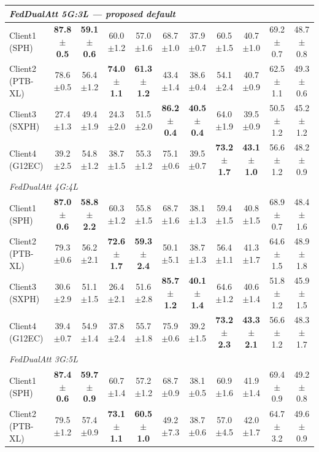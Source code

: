 \documentclass[a4paper]{article}
\begin{document}
\begin{longtable}{l|cc|cc|cc|cc|cc}
  \multicolumn{11}{l}{\textit{FedDualAtt 5G:3L --- proposed default}} \\
  \midrule
  Client1 (SPH)    & \textbf{87.8$\pm$0.5} & \textbf{59.1$\pm$0.6} & 60.0$\pm$1.2 & 57.0$\pm$1.6 & 68.7$\pm$1.0 & 37.9$\pm$0.7 & 60.5$\pm$1.5 & 40.7$\pm$1.0 & 69.2$\pm$0.7 & 48.7$\pm$0.8 \\
  Client2 (PTB-XL) & 78.6$\pm$0.5 & 56.4$\pm$1.2 & \textbf{74.0$\pm$1.1} & \textbf{61.3$\pm$1.2} & 43.4$\pm$1.4 & 38.6$\pm$0.4 & 54.1$\pm$2.4 & 40.7$\pm$0.9 & 62.5$\pm$1.1 & 49.3$\pm$0.6 \\
  Client3 (SXPH)   & 27.4$\pm$1.3 & 49.4$\pm$1.9 & 24.3$\pm$2.0 & 51.5$\pm$2.0 & \textbf{86.2$\pm$0.4} & \textbf{40.5$\pm$0.4} & 64.0$\pm$1.9 & 39.5$\pm$0.9 & 50.5$\pm$1.2 & 45.2$\pm$1.2 \\
  Client4 (G12EC)  & 39.2$\pm$2.5 & 54.8$\pm$1.2 & 38.7$\pm$1.5 & 55.3$\pm$1.2 & 75.1$\pm$0.6 & 39.5$\pm$0.7 & \textbf{73.2$\pm$1.7} & \textbf{43.1$\pm$1.0} & 56.6$\pm$1.2 & 48.2$\pm$0.9 \\
  \midrule
  \multicolumn{11}{l}{\textit{FedDualAtt 4G:4L}} \\
  \midrule
  Client1 (SPH)    & \textbf{87.0$\pm$0.6} & \textbf{58.8$\pm$2.2} & 60.3$\pm$1.2 & 55.8$\pm$1.5 & 68.7$\pm$1.6 & 38.1$\pm$1.3 & 59.4$\pm$1.5 & 40.8$\pm$1.5 & 68.9$\pm$0.7 & 48.4$\pm$1.6 \\
  Client2 (PTB-XL) & 79.3$\pm$0.6 & 56.2$\pm$2.1 & \textbf{72.6$\pm$1.7} & \textbf{59.3$\pm$2.4} & 50.1$\pm$5.1 & 38.7$\pm$1.3 & 56.4$\pm$1.1 & 41.3$\pm$1.7 & 64.6$\pm$1.5 & 48.9$\pm$1.8 \\
  Client3 (SXPH)   & 30.6$\pm$2.9 & 51.1$\pm$1.5 & 26.4$\pm$2.1 & 51.6$\pm$2.8 & \textbf{85.7$\pm$1.2} & \textbf{40.1$\pm$1.4} & 64.6$\pm$1.2 & 40.6$\pm$1.4 & 51.8$\pm$1.2 & 45.9$\pm$1.5 \\
  Client4 (G12EC)  & 39.4$\pm$0.7 & 54.9$\pm$1.4 & 37.8$\pm$2.4 & 55.7$\pm$1.8 & 75.9$\pm$0.6 & 39.2$\pm$1.5 & \textbf{73.2$\pm$2.3} & \textbf{43.3$\pm$2.1} & 56.6$\pm$1.2 & 48.3$\pm$1.7 \\
  \midrule
  \multicolumn{11}{l}{\textit{FedDualAtt 3G:5L}} \\
  \midrule
  Client1 (SPH)    & \textbf{87.4$\pm$0.6} & \textbf{59.7$\pm$0.9} & 60.7$\pm$1.4 & 57.2$\pm$1.2 & 68.7$\pm$0.9 & 38.1$\pm$0.5 & 60.9$\pm$1.6 & 41.9$\pm$1.4 & 69.4$\pm$0.9 & 49.2$\pm$0.8 \\
  Client2 (PTB-XL) & 79.5$\pm$1.2 & 57.4$\pm$0.9 & \textbf{73.1$\pm$1.1} & \textbf{60.5$\pm$1.0} & 49.2$\pm$7.3 & 38.7$\pm$0.6 & 57.0$\pm$4.5 & 42.0$\pm$1.7 & 64.7$\pm$3.2 & 49.6$\pm$0.9 \\

\end{longtable}
\end{document}
